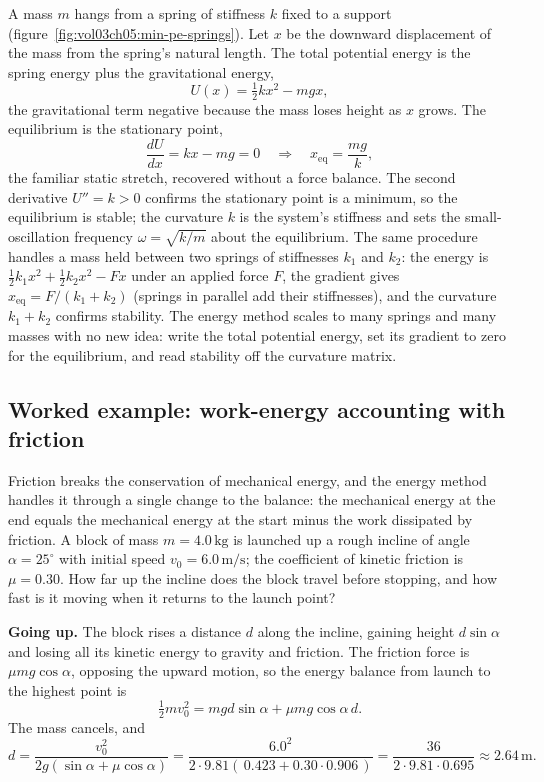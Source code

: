 A mass $m$ hangs from a spring of stiffness $k$ fixed to a support
(figure~\ref{fig:vol03ch05:min-pe-springs}). Let $x$ be the downward
displacement of the mass from the spring's natural length. The total
potential energy is the spring energy plus the gravitational energy,
\[
U(x) = \tfrac12 k x^2 - m g x,
\]
the gravitational term negative because the mass loses height as $x$
grows. The equilibrium is the stationary point,
\[
\frac{dU}{dx} = k x - m g = 0
\quad\Longrightarrow\quad
x_\text{eq} = \frac{mg}{k},
\]
the familiar static stretch, recovered without a force balance. The
second derivative $U'' = k > 0$ confirms the stationary point is a
minimum, so the equilibrium is stable; the curvature $k$ is the system's
stiffness and sets the small-oscillation frequency $\omega = \sqrt{k/m}$
about the equilibrium. The same procedure handles a mass held between two
springs of stiffnesses $k_1$ and $k_2$: the energy is $\tfrac12 k_1 x^2 +
\tfrac12 k_2 x^2 - F x$ under an applied force $F$, the gradient gives
$x_\text{eq} = F/(k_1 + k_2)$ (springs in parallel add their
stiffnesses), and the curvature $k_1 + k_2$ confirms stability. The
energy method scales to many springs and many masses with no new idea:
write the total potential energy, set its gradient to zero for the
equilibrium, and read stability off the curvature matrix.



\subsection{Worked example: work-energy accounting with friction}

Friction breaks the conservation of mechanical energy, and the
energy method handles it through a single change to the balance: the
mechanical energy at the end equals the mechanical energy at the start
minus the work dissipated by friction. A block of mass $m =
4.0\,\si{\kilogram}$ is launched up a rough incline of angle
$\alpha = 25^{\circ}$ with initial speed $v_0 = 6.0\,\si{\meter\per
\second}$; the coefficient of kinetic friction is $\mu = 0.30$. How far
up the incline does the block travel before stopping, and how fast is it
moving when it returns to the launch point?

\textbf{Going up.} The block rises a distance $d$ along the incline,
gaining height $d\sin\alpha$ and losing all its kinetic energy to gravity
and friction. The friction force is $\mu m g\cos\alpha$, opposing the
upward motion, so the energy balance from launch to the highest point is
\[
\tfrac12 m v_0^2 = m g d \sin\alpha + \mu m g \cos\alpha\, d.
\]
The mass cancels, and
\[
d = \frac{v_0^2}{2 g(\sin\alpha + \mu\cos\alpha)}
= \frac{6.0^2}{2 \cdot 9.81 (\,0.423 + 0.30\cdot 0.906\,)}
= \frac{36}{2\cdot 9.81 \cdot 0.695}
\approx 2.64\,\si{\meter}.
\]

